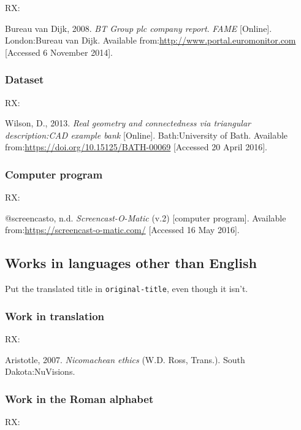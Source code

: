 RX: \cite{bvd2008bt}

Bureau van Dijk, 2008. \emph{BT Group plc company report}. \emph{FAME} [Online]. London:\@ Bureau van Dijk. Available from:\@ \url{http://www.portal.euromonitor.com} [Accessed 6 November 2014].



\subsubsection*{Dataset}

RX: \cite{wilson2013rgc}

Wilson, D., 2013. \emph{Real geometry and connectedness via triangular description:\@ CAD example bank} [Online]. Bath:\@ University of Bath. Available from:\@ \url{https://doi.org/10.15125/BATH-00069} [Accessed 20 April 2016].



\subsubsection*{Computer program}

RX: \cite{screencasto}

@screencasto, n.d. \emph{Screencast-O-Matic} (v.2) [computer program]. Available from:\@ \url{https://screencast-o-matic.com/} [Accessed 16 May 2016].



\subsection{Works in languages other than English}

Put the translated title in \texttt{original-title}, even though it isn't.

\subsubsection*{Work in translation}

RX: \cite{aristotle2007ne}

Aristotle, 2007. \emph{Nicomachean ethics} (W.D. Ross, Trans.). South Dakota:\@ NuVisions.



\subsubsection*{Work in the Roman alphabet}

RX: \cite{esquivel2003cap}

